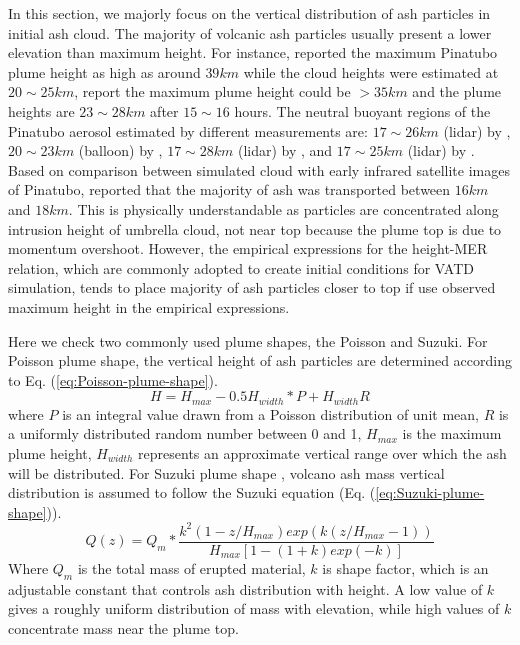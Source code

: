 \documentclass[draft,linenumbers]{agujournal2019}
\begin{document}
In this section, we majorly focus on the vertical distribution of ash particles in initial ash cloud.
The majority of volcanic ash particles usually present a lower elevation than maximum height. For instance, \citet{holasek1996satellite, holasek1996experiments} reported the maximum Pinatubo plume height as high as around $39 km$ while the cloud heights were estimated at $20 \sim 25 km $, \citet{self1993atmospheric} report the maximum plume height could be $>35 km$ and the plume heights are $23 \sim 28 km$ after $15 \sim 16$ hours. The neutral buoyant regions of the Pinatubo aerosol estimated by different measurements are: $17 \sim 26 km$ (lidar) by \citet{defoor1992early}, $20 \sim 23 km$ (balloon) by \citet{deshler1992balloonborne}, $17 \sim 28 km$ (lidar) by \citet{jager1992pinatubo}, and $17 \sim 25 km$ (lidar) by \citet{avdyushin19931}. Based on comparison between simulated cloud with early infrared satellite images of Pinatubo, \citet{fero2008simulation} reported that the majority of ash was transported between $16 km$ and $18 km$. This is physically understandable as particles are concentrated along intrusion height of umbrella cloud, not near top because the plume top is due to momentum overshoot. However, the empirical expressions for the height-MER relation, which are commonly adopted to create initial conditions for VATD simulation, tends to place majority of ash particles closer to top if use observed maximum height in the empirical expressions.

Here we check two commonly used plume shapes, the Poisson and Suzuki.
For Poisson plume shape, the vertical height of ash particles are determined according to Eq. (\ref{eq:Poisson-plume-shape}).
\begin{equation}
H=H_{max} - 0.5 H_{width}*P+H_{width}R
\label{eq:Poisson-plume-shape}
\end{equation}
where $P$ is an integral value drawn from a Poisson distribution of unit mean, $R$ is a uniformly distributed random number between 0 and 1, $H_{max}$ is the maximum plume height, $H_{width}$ represents an approximate vertical range over which the ash will be distributed.
For Suzuki plume shape \citep{suzuki1983theoretical}, volcano ash mass vertical distribution is assumed to follow the Suzuki equation (Eq. (\ref{eq:Suzuki-plume-shape})).
\begin{equation}
Q(z)=Q_m* \frac{k^2(1-z/H_{max})exp\left(k(z/H_{max} -1 )\right)}{H_{max}\left[1-(1+k)exp(-k)\right]}
\label{eq:Suzuki-plume-shape}
\end{equation}
Where $Q_m$ is the total mass of erupted material, $k$ is shape factor, which is an adjustable constant that controls ash distribution with height. A low value of $k$ gives a roughly uniform distribution of mass with elevation, while high values of $k$ concentrate mass near the plume top.
\end{document}
